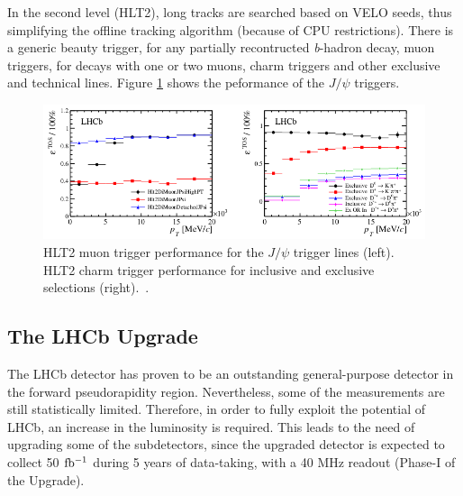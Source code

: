 In the second level (HLT2), long tracks are searched based on VELO seeds, thus simplifying the offline tracking algorithm (because of CPU restrictions). There is a generic beauty trigger, for any partially recontructed \textit{b}-hadron decay, muon triggers, for decays with one or two muons, charm triggers and other exclusive and technical lines. Figure \ref{fig:HLT2Perf} shows the peformance of the $J/\psi$ triggers. %

\begin{figure} [htb!]
\begin{center}
\includegraphics[scale=0.7]{figs/HLT2Perf.png}
\caption{HLT2 muon trigger performance for the $J/\psi$ trigger lines (left). HLT2 charm trigger performance for inclusive and exclusive selections (right).~\cite{Aaij:2014jba}.\label{fig:HLT2Perf}}
\end{center}
\end{figure}



\subsection{The LHCb Upgrade} %


The LHCb detector has proven to be an outstanding general-purpose detector in the forward pseudorapidity region. Nevertheless, some of the measurements are still statistically limited. Therefore, in order to fully exploit the potential of LHCb, an increase in the luminosity is required. This leads to the need of upgrading some of the subdetectors, since the upgraded detector is expected to collect 50 $\rm fb^{-1}$ during 5 years of data-taking, with a 40 MHz readout (Phase-I of the Upgrade).

